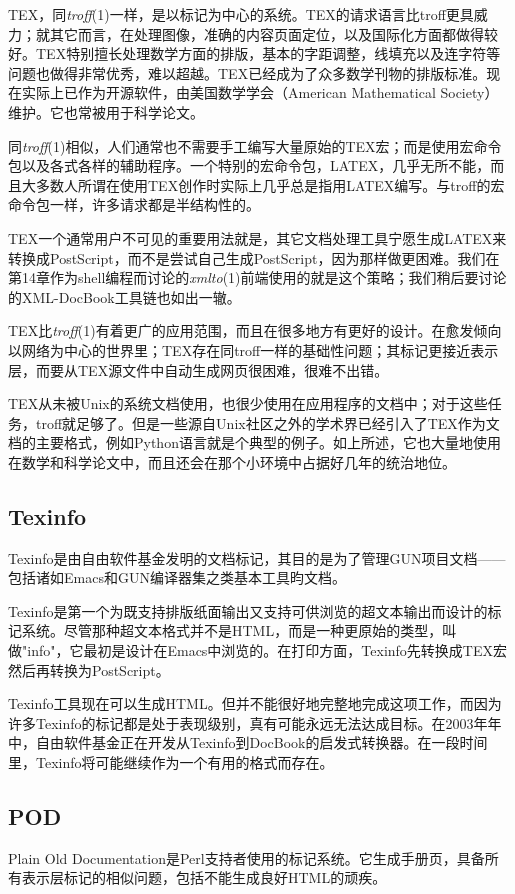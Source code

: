 \documentclass[12pt,oneside]{book}
\begin{document}
\begin{common-format}
TEX，同\textit{troff}(1)一样，是以标记为中心的系统。TEX的请求语言比troff更具威力；就其它而言，在处理图像，准确的内容页面定位，以及国际化方面都做得较好。TEX特别擅长处理数学方面的排版，基本的字距调整，线填充以及连字符等问题也做得非常优秀，难以超越。TEX已经成为了众多数学刊物的排版标准。现在实际上已作为开源软件，由美国数学学会（American Mathematical Society）维护。它也常被用于科学论文。

同\textit{troff}(1)相似，人们通常也不需要手工编写大量原始的TEX宏；而是使用宏命令包以及各式各样的辅助程序。一个特别的宏命令包，LATEX，几乎无所不能，而且大多数人所谓在使用TEX创作时实际上几乎总是指用LATEX编写。与troff的宏命令包一样，许多请求都是半结构性的。

TEX一个通常用户不可见的重要用法就是，其它文档处理工具宁愿生成LATEX来转换成PostScript，而不是尝试自己生成PostScript，因为那样做更困难。我们在第14章作为shell编程而讨论的\textit{xmlto}(1)前端使用的就是这个策略；我们稍后要讨论的XML-DocBook工具链也如出一辙。

TEX比\textit{troff}(1)有着更广的应用范围，而且在很多地方有更好的设计。在愈发倾向以网络为中心的世界里；TEX存在同troff一样的基础性问题；其标记更接近表示层，而要从TEX源文件中自动生成网页很困难，很难不出错。

TEX从未被Unix的系统文档使用，也很少使用在应用程序的文档中；对于这些任务，troff就足够了。但是一些源自Unix社区之外的学术界已经引入了TEX作为文档的主要格式，例如Python语言就是个典型的例子。如上所述，它也大量地使用在数学和科学论文中，而且还会在那个小环境中占据好几年的统治地位。

\subsection{Texinfo}
Texinfo是由自由软件基金发明的文档标记，其目的是为了管理GUN项目文档——包括诸如Emacs和GUN编译器集之类基本工具昀文档。

Texinfo是第一个为既支持排版纸面输出又支持可供浏览的超文本输出而设计的标记系统。尽管那种超文本格式并不是HTML，而是一种更原始的类型，叫做"info"，它最初是设计在Emacs中浏览的。在打印方面，Texinfo先转换成TEX宏然后再转换为PostScript。

Texinfo工具现在可以生成HTML。但并不能很好地完整地完成这项工作，而因为许多Texinfo的标记都是处于表现级别，真有可能永远无法达成目标。在2003年年中，自由软件基金正在开发从Texinfo到DocBook的启发式转换器。在一段时间里，Texinfo将可能继续作为一个有用的格式而存在。

\subsection{POD}
Plain Old Documentation是Perl支持者使用的标记系统。它生成手册页，具备所有表示层标记的相似问题，包括不能生成良好HTML的顽疾。


\end{common-format}
\end{document}
